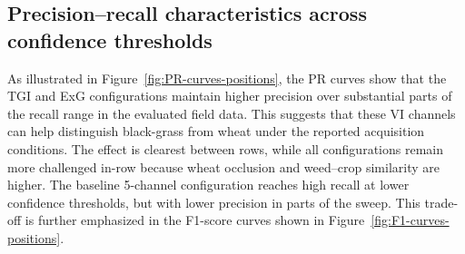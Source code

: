 \documentclass{ieeeaccess}
\begin{document}
\subsection{Precision--recall characteristics across confidence thresholds}
As illustrated in Figure~\ref{fig:PR-curves-positions}, the PR curves show that the TGI and ExG configurations maintain higher precision over substantial parts of the recall range in the evaluated field data. This suggests that these VI channels can help distinguish black-grass from wheat under the reported acquisition conditions. The effect is clearest between rows, while all configurations remain more challenged in-row because wheat occlusion and weed--crop similarity are higher. The baseline 5-channel configuration reaches high recall at lower confidence thresholds, but with lower precision in parts of the sweep. This trade-off is further emphasized in the F1-score curves shown in Figure~\ref{fig:F1-curves-positions}.
\end{document}
